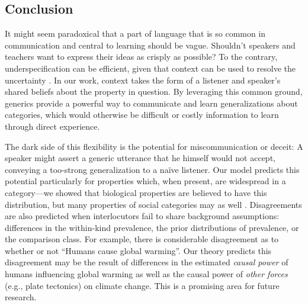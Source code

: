 \documentclass[12pt,letterpaper]{article}
\begin{document}


\subsection*{Conclusion}

It might seem paradoxical that a part of language that is so common in communication and central to learning should be vague. 
Shouldn't speakers and teachers want to express their ideas as crisply as possible?
To the contrary, underspecification can be efficient, given that context can be used to resolve the uncertainty \cite{Piantadosi2012}.
In our work, context takes the form of a listener and speaker's shared beliefs about the property in question. 
By leveraging this common ground, generics provide a powerful way to communicate and learn generalizations about categories, 
which would otherwise be difficult or costly information to learn through direct experience.

The dark side of this flexibility is the potential for miscommunication or deceit: A speaker might assert a generic utterance that he himself would not accept, conveying a too-strong generalization to a na\"{i}ve listener.  
Our model predicts this potential particularly for properties which, when present, are widespread in a category---we showed that biological properties are believed to have this distribution, but many properties of social categories may as well \cite{Cimpian2011a,Cimpian2012b,Rhodes2012}.
Disagreements are also predicted when interlocutors fail to share background assumptions:
differences in the within-kind prevalence, the prior distributions of prevalence, or the comparison class.
For example, there is considerable disagreement as to whether or not ``Humans cause global warming''.
Our theory predicts this disagreement may be the result of differences in the estimated \emph{causal power} of humans influencing global warming as well as the causal power of \emph{other forces} (e.g., plate tectonics) on climate change.
This is a promising area for future research.
\end{document}
